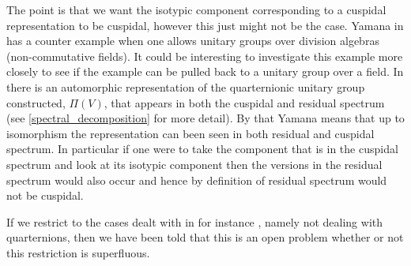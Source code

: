 The point is that we want the isotypic component corresponding to a cuspidal representation to be cuspidal, however this just might not be the case. 
Yamana in \cite[Rm. 7.12]{yamanaSiegelWeilFormulaQuaternionic2013} has a counter example when one allows unitary groups over division algebras (non-commutative fields). It could be interesting to investigate this example more closely to see if the example can be pulled back to a unitary group over a field. In \cite{yamanaSiegelWeilFormulaQuaternionic2013} there is an automorphic representation of the quarternionic unitary group constructed, \(\Pi(V)\), that appears in both the cuspidal and residual spectrum (see \ref{spectral_decomposition} for more detail). By that Yamana means that up to isomorphism the representation can been seen in both residual and cuspidal spectrum. In particular if one were to take the component that is in the cuspidal spectrum and look at its isotypic component then the versions in the residual spectrum would also occur and hence by definition of residual spectrum would not be cuspidal.

If we restrict to the cases dealt with in for instance \cite{moeglinSpectralDecompositionEisenstein1995}, namely not dealing with quarternions, then we have been told that this is an open problem whether or not this restriction is superfluous. 